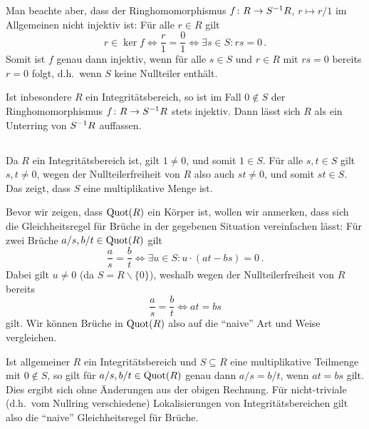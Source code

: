 \begin{remark}
  \label{remark: injectivity of the canonical map}
  Man beachte aber, dass der Ringhomomorphismus $f \colon R \to \localset{R}{S}$, $r \mapsto r/1$ im Allgemeinen nicht injektiv ist:
  Für alle $r \in R$ gilt
  \[
          r \in \ker f
    \iff  \frac{r}{1} = \frac{0}{1}
    \iff  \exists s \in S: rs = 0 \,.
  \]
  Somit ist $f$ genau dann injektiv, wenn für alle $s \in S$ und $r \in R$ mit $rs = 0$ bereits $r = 0$ folgt, d.h.\ wenn $S$ keine Nullteiler enthält.
  
  Ist inbesondere $R$ ein Integritätsbereich, so ist im Fall $0 \notin S$ der Ringhomomorphismus $f \colon R \to \localset{R}{S}$ stets injektiv.
  Dann lässt sich $R$ als ein Unterring von $\localset{R}{S}$ auffassen.
\end{remark}





\subsection{}

Da $R$ ein Integritätsbereich ist, gilt $1 \neq 0$, und somit $1 \in S$.
Für alle $s, t \in S$ gilt $s, t \neq 0$, wegen der Nullteilerfreiheit von $R$ also auch $st \neq 0$, und somit $st \in S$.
Das zeigt, dass $S$ eine multiplikative Menge ist.

Bevor wir zeigen, dass $\Quot{R}$ ein Körper ist, wollen wir anmerken, dass sich die Gleichheitsregel für Brüche in der gegebenen Situation vereinfachen lässt:
Für zwei Brüche $a/s, b/t \in \Quot{R}$ gilt
\[
        \frac{a}{s} = \frac{b}{t}
  \iff  \exists u \in S: u \cdot (at - bs) = 0 \,.
\]
Dabei gilt $u \neq 0$ (da $S = R \smallsetminus \{0\}$), weshalb wegen der Nullteilerfreiheit von $R$ bereits
\begin{equation}
  \label{equation: comparing fractions over integral domains}
    \frac{a}{s}
  = \frac{b}{t}
  \iff
    at = bs
\end{equation}
gilt.
Wir können Brüche in $\Quot{R}$ also auf die \enquote{naive} Art und Weise vergleichen.

\begin{remark}
  Ist allgemeiner $R$ ein Integritätsbereich und $S \subseteq R$ eine multiplikative Teilmenge mit $0 \notin S$, so gilt für $a/s, b/t \in \Quot{R}$ genau dann $a/s = b/t$, wenn $at = bs$ gilt.
  Dies ergibt sich ohne Änderungen aus der obigen Rechnung.
  Für nicht-triviale (d.h.\ vom Nullring verschiedene) Lokalisierungen von Integritätsbereichen gilt also die \enquote{naive} Gleichheitsregel für Brüche.
\end{remark}


